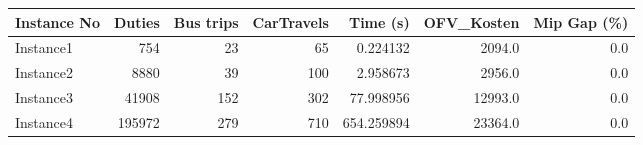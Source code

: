 \begin{tabular}{lrrrrrr}
\toprule
Instance No &  Duties &  Bus trips &  CarTravels &    Time (s) &  OFV\_Kosten &  Mip Gap (\%) \\
\midrule
  Instance1 &     754 &         23 &          65 &    0.224132 &      2094.0 &          0.0 \\
  Instance2 &    8880 &         39 &         100 &    2.958673 &      2956.0 &          0.0 \\
  Instance3 &   41908 &        152 &         302 &   77.998956 &     12993.0 &          0.0 \\
  Instance4 &  195972 &        279 &         710 &  654.259894 &     23364.0 &          0.0 \\
\bottomrule
\end{tabular}
